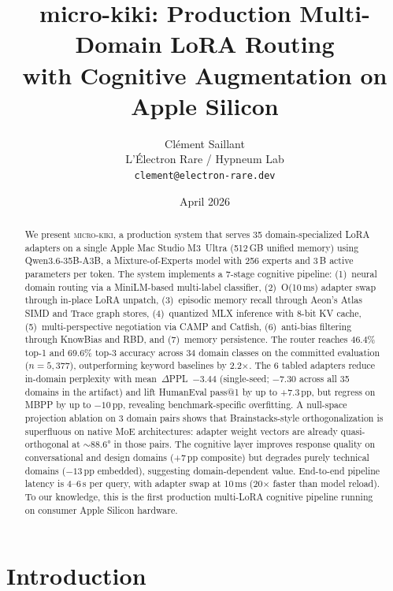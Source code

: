 \documentclass[11pt,a4paper]{article}
\title{\textbf{micro-kiki}: Production Multi-Domain LoRA Routing\\with Cognitive Augmentation on Apple Silicon}
\author{
  Cl\'{e}ment Saillant \\
  L'\'{E}lectron Rare / Hypneum Lab \\
  \texttt{clement@electron-rare.dev}
}
\date{April 2026}
\begin{document}
\maketitle

\begin{abstract}
We present \textsc{micro-kiki}, a production system that serves 35 domain-specialized LoRA adapters on a single Apple Mac Studio M3~Ultra (512\,GB unified memory) using Qwen3.6-35B-A3B, a Mixture-of-Experts model with 256 experts and 3\,B active parameters per token. The system implements a 7-stage cognitive pipeline: (1)~neural domain routing via a MiniLM-based multi-label classifier, (2)~O(10\,ms) adapter swap through in-place LoRA unpatch, (3)~episodic memory recall through Aeon's Atlas SIMD and Trace graph stores, (4)~quantized MLX inference with 8-bit KV cache, (5)~multi-perspective negotiation via CAMP and Catfish, (6)~anti-bias filtering through KnowBias and RBD, and (7)~memory persistence. The router reaches 46.4\% top-1 and 69.6\% top-3 accuracy across 34 domain classes on the committed evaluation ($n = 5{,}377$), outperforming keyword baselines by 2.2$\times$. The 6 tabled adapters reduce in-domain perplexity with mean~$\Delta$PPL~$-3.44$ (single-seed; $-7.30$ across all 35 domains in the artifact) and lift HumanEval pass@1 by up to +7.3\,pp, but regress on MBPP by up to $-10$\,pp, revealing benchmark-specific overfitting. A null-space projection ablation on 3 domain pairs shows that Brainstacks-style orthogonalization is superfluous on native MoE architectures: adapter weight vectors are already quasi-orthogonal at ${\sim}88.6$° in those pairs. The cognitive layer improves response quality on conversational and design domains (+7\,pp composite) but degrades purely technical domains ($-13$\,pp embedded), suggesting domain-dependent value. End-to-end pipeline latency is 4--6\,s per query, with adapter swap at 10\,ms (20$\times$ faster than model reload). To our knowledge, this is the first production multi-LoRA cognitive pipeline running on consumer Apple Silicon hardware.
\end{abstract}

\section{Introduction}
\label{sec:intro}
\end{document}
